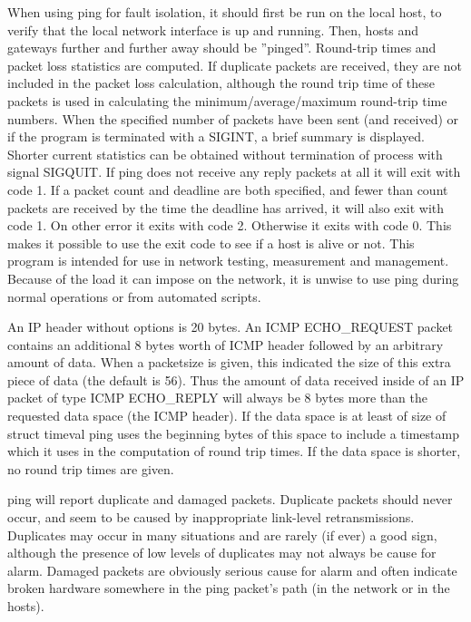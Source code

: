 \vspace{4ex} \newline
When using ping for fault isolation, it should first be run on the local host, to verify that the local network interface is up and running. 
Then, hosts and gateways further and further away should be ''pinged''. 
Round-trip times and packet loss statistics are computed. 
If duplicate packets are received, they are not included in the packet loss calculation, although the round trip time of these packets is used in calculating the minimum/average/maximum round-trip time numbers. 
When the specified number of packets have been sent (and received) or if the program is terminated with a SIGINT, a brief summary is displayed. 
Shorter current statistics can be obtained without termination of process with signal SIGQUIT.
\vspace{1ex} \newline
If ping does not receive any reply packets at all it will exit with code 1. 
If a packet count and deadline are both specified, and fewer than count packets are received by the time the deadline has arrived, it will also exit with code 1. 
On other error it exits with code 2. Otherwise it exits with code 0. 
This makes it possible to use the exit code to see if a host is alive or not.
\vspace{1ex} \newline
This program is intended for use in network testing, measurement and management. 
Because of the load it can impose on the network, it is unwise to use ping during normal operations or from automated scripts.

\vspace{4ex} \newline %
An IP header without options is 20 bytes. 
An ICMP ECHO_REQUEST packet contains an additional 8 bytes worth of ICMP header followed by an arbitrary amount of data. 
When a packetsize is given, this indicated the size of this extra piece of data (the default is 56). 
Thus the amount of data received inside of an IP packet of type ICMP ECHO_REPLY will always be 8 bytes more than the requested data space (the ICMP header).
\vspace{1ex} \newline
If the data space is at least of size of struct timeval ping uses the beginning bytes of this space to include a timestamp which it uses in the computation of round trip times. 
If the data space is shorter, no round trip times are given.

\vspace{4ex} \newline %
ping will report duplicate and damaged packets. 
Duplicate packets should never occur, and seem to be caused by inappropriate link-level retransmissions. 
Duplicates may occur in many situations and are rarely (if ever) a good sign, although the presence of low levels of duplicates may not always be cause for alarm.
\vspace{1ex} \newline
Damaged packets are obviously serious cause for alarm and often indicate broken hardware somewhere in the ping packet's path (in the network or in the hosts).

